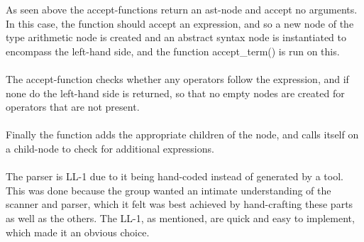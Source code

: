 As seen above the accept-functions return an \ac{ast}-node and accept no arguments. In this case, the function should accept an expression, and so a new node of the type arithmetic node is created and an abstract syntax node is instantiated to encompass the left-hand side, and the function accept\_term() is run on this. 
\\
\\
The accept-function checks whether any operators follow the expression, and if none do the left-hand side is returned, so that no empty nodes are created for operators that are not present.
\\
\\
Finally the function adds the appropriate children of the node, and calls itself on a child-node to check for additional expressions.
\\
\\
The parser is LL-1 due to it being hand-coded instead of generated by a tool. This was done because the group wanted an intimate understanding of the scanner and parser, which it felt was best achieved by hand-crafting these parts as well as the others. The LL-1, as mentioned, are quick and easy to implement, which made it an obvious choice.